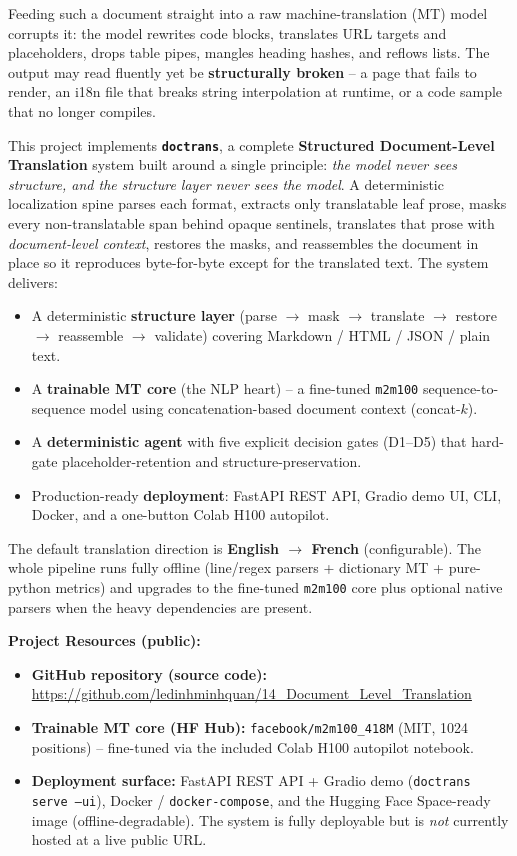 \documentclass[12pt,a4paper]{article}
\begin{document}
Feeding such a document straight into a raw machine-translation (MT) model corrupts it: the model rewrites code blocks, translates URL targets and placeholders, drops table pipes, mangles heading hashes, and reflows lists. The output may read fluently yet be \textbf{structurally broken} -- a page that fails to render, an i18n file that breaks string interpolation at runtime, or a code sample that no longer compiles.

This project implements \textbf{\texttt{doctrans}}, a complete \textbf{Structured Document-Level Translation} system built around a single principle: \emph{the model never sees structure, and the structure layer never sees the model}. A deterministic localization spine parses each format, extracts only translatable leaf prose, masks every non-translatable span behind opaque sentinels, translates that prose with \emph{document-level context}, restores the masks, and reassembles the document in place so it reproduces byte-for-byte except for the translated text. The system delivers:

\begin{itemize}
  \item A deterministic \textbf{structure layer} (parse $\rightarrow$ mask $\rightarrow$ translate $\rightarrow$ restore $\rightarrow$ reassemble $\rightarrow$ validate) covering Markdown / HTML / JSON / plain text.
  \item A \textbf{trainable MT core} (the NLP heart) -- a fine-tuned \texttt{m2m100} sequence-to-sequence model using concatenation-based document context (concat-$k$).
  \item A \textbf{deterministic agent} with five explicit decision gates (D1--D5) that hard-gate placeholder-retention and structure-preservation.
  \item Production-ready \textbf{deployment}: FastAPI REST API, Gradio demo UI, CLI, Docker, and a one-button Colab H100 autopilot.
\end{itemize}

The default translation direction is \textbf{English $\rightarrow$ French} (configurable). The whole pipeline runs fully offline (line/regex parsers + dictionary MT + pure-python metrics) and upgrades to the fine-tuned \texttt{m2m100} core plus optional native parsers when the heavy dependencies are present.

\textbf{Project Resources (public):}
\begin{itemize}\setlength\itemsep{0.15em}
  \item \textbf{GitHub repository (source code):} \url{https://github.com/ledinhminhquan/14_Document_Level_Translation}
  \item \textbf{Trainable MT core (HF Hub):} \texttt{facebook/m2m100\_418M} (MIT, 1024 positions) -- fine-tuned via the included Colab H100 autopilot notebook.
  \item \textbf{Deployment surface:} FastAPI REST API + Gradio demo (\texttt{doctrans serve --ui}), Docker / \texttt{docker-compose}, and the Hugging Face Space-ready image (offline-degradable). The system is fully deployable but is \emph{not} currently hosted at a live public URL.
\end{itemize}
\end{document}
